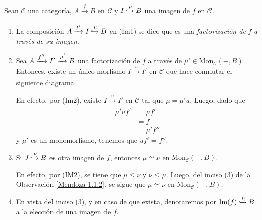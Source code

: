 \documentclass[tesis]{subfiles}
\begin{document}
\begin{Obs}\label{Mendoza-1.4.1}
    Sean $\mathscr{C}$ una categoría, $A\xrightarrow[]{f} B$ en $\mathscr{C}$ y $I\xhookrightarrow{\mu} B$ una imagen de $f$ en $\mathscr{C}$.

    \begin{enumerate}[label=(\arabic*)]
    
        \item La composición $A\xrightarrow[]{f'} I\xhookrightarrow[]{\mu} B$ en (Im1) se dice que es una \emph{factorización de} $f$ \emph{a través de su imagen}.

        \item Sea $A\xrightarrow[]{f''} I'\xhookrightarrow{\mu'} B$ una factorización de $f$ a través de $\mu'\in\text{Mon}_\mathscr{C}(-,B)$. Entonces, existe un único morfismo $I\xrightarrow[]{u}I'$ en $\mathscr{C}$ que hace conmutar el siguiente diagrama
            \begin{center}
            \end{center}
            
            En efecto, por (Im2), existe $I\xrightarrow[]{u}I'$ en $\mathscr{C}$ tal que $\mu=\mu'u$. Luego, dado que
            \begin{align*}
                \mu'uf' &= \mu f' \\
                        &= f \\
                        &= \mu'f''
            \end{align*}
            y $\mu'$ es un monomorfismo, tenemos que $uf'=f''$.

        \item Si $J\xhookrightarrow{\nu}B$ es otra imagen de $f$, entonces $\mu\simeq\nu$ en $\text{Mon}_\mathscr{C}(-,B)$.

            En efecto, por (IM2), se tiene que $\mu\le\nu$ y $\nu\le\mu$. Luego, del inciso (3) de la Observación \ref{Mendoza-1.1.2}, se sigue que $\mu\simeq\nu$ en $\text{Mon}_\mathscr{C}(-,B)$.

        \item En vista del inciso (3), y en caso de que exista, denotaremos por $\text{Im}(f)\xhookrightarrow{\mu} B$ a la elección de una imagen de $f$. %
    \end{enumerate}
\end{Obs}
\end{document}
